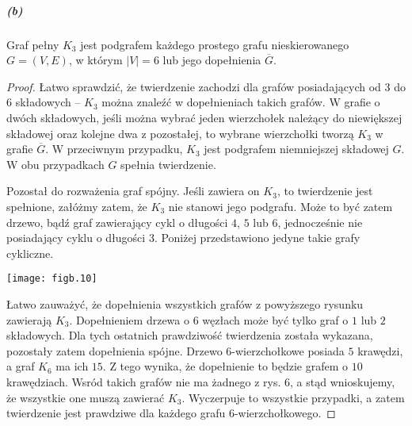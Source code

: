 \subparagraph{(b)}
\begin{twierdzenie*}
	Graf pełny $K_3$ jest podgrafem każdego prostego grafu nieskierowanego $G=(V,E)$, w którym $|V|=6$ lub jego dopełnienia $\overline{G}$.
\end{twierdzenie*}
\begin{proof}
Łatwo sprawdzić, że twierdzenie zachodzi dla grafów posiadających od $3$ do $6$ składowych -- $K_3$ można znaleźć w dopełnieniach takich grafów. W grafie o dwóch składowych, jeśli można wybrać jeden wierzchołek należący do niewiększej składowej oraz kolejne dwa z pozostałej, to wybrane wierzchołki tworzą $K_3$ w grafie $\overline{G}$. W przeciwnym przypadku, $K_3$ jest podgrafem niemniejszej składowej $G$. W obu przypadkach $G$ spełnia twierdzenie.

Pozostał do rozważenia graf spójny. Jeśli zawiera on $K_3$, to twierdzenie jest spełnione, załóżmy zatem, że $K_3$ nie stanowi jego podgrafu. Może to być zatem drzewo, bądź graf zawierający cykl o długości $4$, $5$ lub $6$, jednocześnie nie posiadający cyklu o długości $3$. Poniżej przedstawiono jedyne takie grafy cykliczne.
	\begin{center}
		\texttt{[image: figb.10]}
	\end{center}
Łatwo zauważyć, że dopełnienia wszystkich grafów z powyższego rysunku zawierają $K_3$. Dopełnieniem drzewa o $6$ węzłach może być tylko graf o $1$ lub $2$ składowych. Dla tych ostatnich prawdziwość twierdzenia została wykazana, pozostały zatem dopełnienia spójne. Drzewo $6$-wierzchołkowe posiada $5$ krawędzi, a graf $K_6$ ma ich $15$. Z tego wynika, że dopełnienie to będzie grafem o $10$ krawędziach. Wsród takich grafów nie ma żadnego z rys. 6, a stąd wnioskujemy, że wszystkie one muszą zawierać $K_3$. Wyczerpuje to wszystkie przypadki, a zatem twierdzenie jest prawdziwe dla każdego grafu $6$-wierzchołkowego.

\end{proof}

